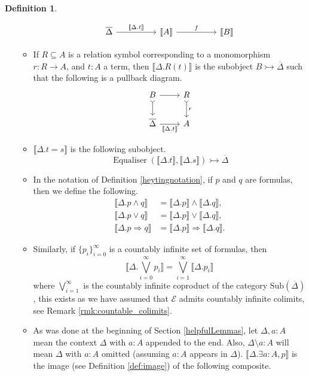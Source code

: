 \documentclass{birkjour}
\theoremstyle{plain}
\theoremstyle{definition}
\newtheorem{definition}[thm]{Definition} %
\newcommand{\call}[1]{\mathcal{#1}}
\begin{document}
\begin{definition}
\begin{itemize}
\begin{itemize}
				\[
				\begin{tikzcd}[column sep = huge]
					\overline{\Delta} \arrow[r,"{\llbracket \Delta . t \rrbracket}"] & \llbracket A\rrbracket\arrow[r,"f"] & \llbracket B\rrbracket
				\end{tikzcd}
				\]
				\item If $R \subseteq A$ is a relation symbol corresponding to a monomorphism $r: R \to A$, and $t: A$ a term, then $\llbracket \Delta . R(t) \rrbracket$ is the subobject $B \rightarrowtail \overline{\Delta}$ such that the following is a pullback diagram.
				\[
				\begin{tikzcd}
					B\arrow[r]\arrow[d,rightarrowtail] & R\arrow[d,rightarrowtail,"r"]\\
					\overline{\Delta}\arrow[r,swap,"{\llbracket \Delta . t\rrbracket}"] & A
				\end{tikzcd}
				\]
				\item $\llbracket \Delta . t = s\rrbracket$ is the following subobject.
				\[\operatorname{Equaliser}(\llbracket \Delta . t\rrbracket, \llbracket \Delta . s \rrbracket) \rightarrowtail \overline{\Delta}\]
				\item In the notation of Definition \ref{heytingnotation}, if $p$ and $q$ are formulas, then we define the following.
				\begin{align*}
					\llbracket \Delta . p \wedge q \rrbracket &= \llbracket \Delta . p \rrbracket \wedge \llbracket \Delta . q \rrbracket,\\
					\llbracket \Delta . p \vee q \rrbracket &= \llbracket \Delta . p \rrbracket \vee \llbracket \Delta . q \rrbracket,\\
					\llbracket \Delta . p \Rightarrow q \rrbracket &= \llbracket \Delta . p \rrbracket \Rightarrow \llbracket \Delta . q \rrbracket.
				\end{align*}
				\item Similarly, if $\lbrace p_i\rbrace_{i = 0}^\infty$ is a countably infinite set of formulas, then
				\[\llbracket \Delta . \bigvee_{i = 0}^\infty p_i\rrbracket = \bigvee_{i=1}^\infty\llbracket \Delta . p_i\rrbracket\]
				where $\displaystyle\bigvee_{i=1}^{\infty}$ is the countably infinite coproduct of the category $\text{Sub}(\overline{\Delta})$, this exists as we have assumed that $\call{E}$ admits countably infinite colimits, see Remark \ref{rmk:countable_colimits}.
				\item As was done at the beginning of Section \ref{helpfulLemmas}, let $\Delta, a:A$ mean the context $\Delta$ with $a:A$ appended to the end. Also, $\Delta\setminus a:A$ will mean $\Delta$ with $a:A$ omitted (assuming $a:A$ appears in $\Delta$). $\llbracket \Delta . \exists a: A, p\rrbracket$ is the image (see Definition \ref{def:image}) of the following composite.

\end{itemize}
\end{itemize}
\end{definition}
\end{document}
